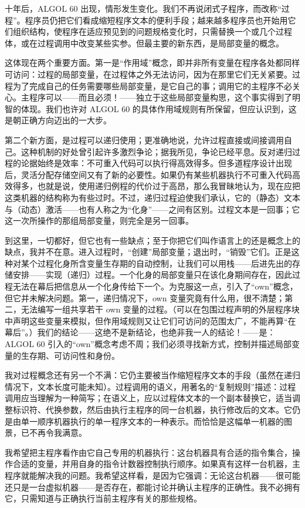 十年后，ALGOL 60 出现，情形发生变化。我们不再说闭式子程序，而改称“过程”。程序员仍把它们看成缩短程序文本的便利手段；越来越多程序员也开始用它们组织结构，使程序在适应预见到的问题规格变化时，只需替换一个或几个过程体，或在过程调用中改变某些实参。但最主要的新东西，是局部变量的概念。

这体现在两个重要方面。第一是“作用域”概念，即并非所有变量在程序各处都同样可访问：过程的局部变量，在过程体之外无法访问，因为在那里它们无关紧要。过程为了完成自己的任务需要哪些局部变量，是它自己的事；调用它的主程序不必关心。主程序可以——而且必须！——独立于这些局部变量构思，这个事实得到了明智的体现。我们也许对 ALGOL 60 的具体作用域规则有所保留，但应认识到，这是朝正确方向迈出的一大步。

第二个新方面，是过程可以递归使用；更准确地说，允许过程直接或间接调用自己。这种机制的好处曾引起许多激烈争论；据我所见，争论已经平息。反对递归过程的论据始终是效率：不可重入代码可以执行得高效得多。但多道程序设计出现后，灵活分配存储空间又有了新的必要性。如果仍有某些机器执行不可重入代码高效得多，也就是说，使用递归例程的代价过于高昂，那么我冒昧地认为，现在应把这类机器的结构称为有些过时。不过，递归过程迫使我们承认，它的（静态）文本与（动态）激活——也有人称之为“化身”——之间有区别。过程文本是一回事；它这一次所操作的那组局部变量，则完全是另一回事。

到这里，一切都好，但它也有一些缺点；至于你把它们叫作语言上的还是概念上的缺点，我并不在意。进入过程时，“创建”局部变量；退出时，“销毁”它们。正是这种对某个过程化身所含变量生存期的自动控制，让我们可以用栈——后进先出的存储安排——实现（递归）过程。一个化身的局部变量只在该化身期间存在，因此过程无法在幕后把信息从一个化身传给下一个。为克服这一点，引入了“own”概念，但它并未解决问题。第一，递归情况下，own 变量究竟有什么用，很不清楚；第二，无法编写一组共享若干 own 变量的过程。（可以在包围过程声明的外层程序块中声明这些变量来模拟，但作用域规则又让它们可访问的范围太广，不能再算“在幕后”。）我们的结论——这绝不是新结论，也绝非我一人的结论！——是：ALGOL 60 引入的“own”概念考虑不周；我们必须寻找新方式，控制并描述局部变量的生存期、可访问性和身份。

我对过程概念还有另一个不满：它仍主要被当作缩短程序文本的手段（虽然在递归情况下，文本长度可能未知）。过程调用的语义，用著名的“复制规则”描述：过程调用应当理解为一种简写；在语义上，应以过程体文本的一个副本替换它，适当调整标识符、代换参数，然后由执行主程序的同一台机器，执行修改后的文本。它仍是由单一顺序机器执行的单一程序文本的一种表示。而恰恰是这幅单一机器的图景，已不再令我满意。

我希望把主程序看作由它自己专用的机器执行：这台机器具有合适的指令集合，操作合适的变量，并用自身的指令计数器控制执行顺序。如果真有这样一台机器，主程序就能解决我的问题。我希望这样看，是因为它强调：无论这台机器——很可能还只是一台虚拟机器——是否存在，都能讨论并确认主程序的正确性。我不必拥有它，只需知道与正确执行当前主程序有关的那些规格。

